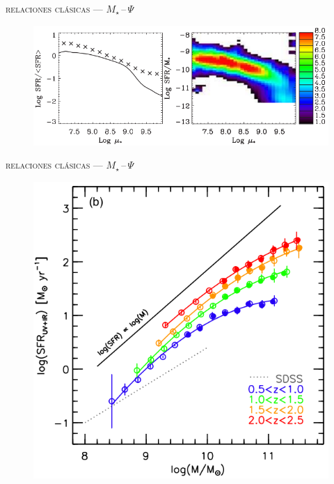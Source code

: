 \documentclass[xcolor=dvipsnames,4pt,hyperref={colorlinks,citecolor=black,linkcolor=black,urlcolor=black}]{beamer}
\begin{document}
\begin{frame}{\textsc{relaciones clásicas --- $M_\star\,$--$\,\Psi$}}
\begin{figure}
\includegraphics[scale=1]{img/brinchmann2004-25}
\end{figure}
\end{frame}

\begin{frame}{\textsc{relaciones clásicas --- $M_\star\,$--$\,\Psi$}}

\begin{figure}
\includegraphics[scale=1]{img/whitaker2014-1}
\end{figure}
\end{frame}
\end{document}
